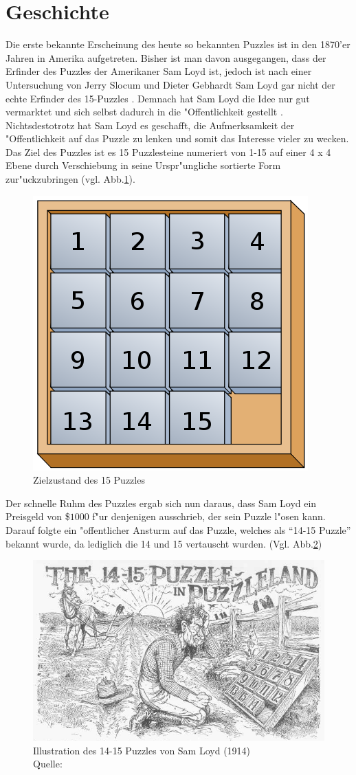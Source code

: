 \section{Geschichte} %
\label{cha:Geschichte}
Die erste bekannte Erscheinung des heute so bekannten Puzzles ist in den 1870'er Jahren in Amerika aufgetreten. Bisher ist man davon ausgegangen, dass der Erfinder des Puzzles der Amerikaner Sam Loyd ist, jedoch ist nach einer Untersuchung von Jerry Slocum und Dieter Gebhardt Sam Loyd gar nicht der echte Erfinder des 15-Puzzles \autocite{anchor-puzzle:book, the-15-puzzle:online}. Demnach hat Sam Loyd die Idee nur gut vermarktet und sich selbst dadurch in die "Offentlichkeit gestellt \autocite{wiki-15-puzzle:online}.\\
Nichtsdestotrotz hat Sam Loyd es geschafft, die Aufmerksamkeit der "Offentlichkeit auf das Puzzle zu lenken und somit das Interesse vieler zu wecken.\\
Das Ziel des Puzzles ist es 15 Puzzlesteine numeriert von 1-15 auf einer 4 x 4 Ebene durch Verschiebung in seine Urspr"ungliche sortierte Form zur"uckzubringen (vgl. Abb.\ref{fig:puzzle-end}).
\begin{figure}[H]
    \centering
    \includegraphics[width=.3\textwidth,keepaspectratio]{img/Fifteen_puzzle.png}
    \captionsetup{format=hang}
    \caption[Zielzustand des 15 Puzzles]{\label{fig:puzzle-end}Zielzustand des 15 Puzzles}
\end{figure}
Der schnelle Ruhm des Puzzles ergab sich nun daraus, dass Sam Loyd ein Preisgeld von \$$1000$ f"ur denjenigen ausschrieb, der sein Puzzle l"osen kann. Darauf folgte ein "offentlicher Ansturm auf das Puzzle, welches als \enquote{14-15 Puzzle} bekannt wurde, da lediglich die 14 und 15 vertauscht wurden. (Vgl. Abb.\ref{fig:puzzle-illustration})
\begin{figure}[H]
    \centering
    \includegraphics[width=.6\textwidth,keepaspectratio]{img/sam-loyd-puzzle-illustration.jpg}
    \captionsetup{format=hang}
    \caption[Illustration des 14-15 Puzzles von Sam Loyd]{\label{fig:puzzle-illustration}Illustration des 14-15 Puzzles von Sam Loyd (1914) \\Quelle: \cite[pp. 234-235]{loyd-cyclopedia:book}}
\end{figure}
